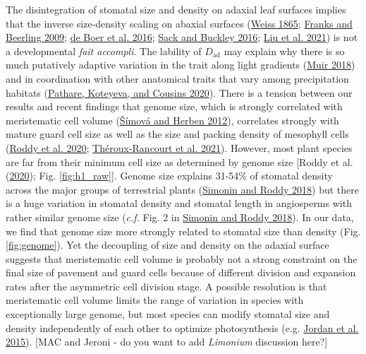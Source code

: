 \documentclass[
  12pt,
]{article}
\begin{document}
The disintegration of stomatal size and density on adaxial leaf surfaces implies that the inverse size-density scaling on abaxial surfaces (\protect\hyperlink{ref-weiss_untersuchungen_1865}{Weiss 1865}; \protect\hyperlink{ref-franks_maximum_2009}{Franks and Beerling 2009}; \protect\hyperlink{ref-de_boer_optimal_2016}{de Boer et al. 2016}; \protect\hyperlink{ref-sack_developmental_2016}{Sack and Buckley 2016}; \protect\hyperlink{ref-liu_scaling_2021}{Liu et al. 2021}) is not a developmental \emph{fait accompli}. The lability of \(D_\text{ad}\) may explain why there is so much putatively adaptive variation in the trait along light gradients (\protect\hyperlink{ref-muir_light_2018}{Muir 2018}) and in coordination with other anatomical traits that vary among precipitation habitats (\protect\hyperlink{ref-pathare_increased_2020}{Pathare, Koteyeva, and Cousins 2020}). There is a tension between our results and recent findings that genome size, which is strongly correlated with meristematic cell volume (\protect\hyperlink{ref-simova_geometrical_2012}{Šímová and Herben 2012}), correlates strongly with mature guard cell size as well as the size and packing density of mesophyll cells (\protect\hyperlink{ref-roddy_scaling_2020}{Roddy et al. 2020}; \protect\hyperlink{ref-theroux-rancourt_maximum_2021}{Théroux-Rancourt et al. 2021}). However, most plant species are far from their minimum cell size as determined by genome size {[}Roddy et al. (\protect\hyperlink{ref-roddy_scaling_2020}{2020}); Fig. \ref{fig:h1_raw}{]}. Genome size explains 31-54\% of stomatal density across the major groups of terrestrial plants (\protect\hyperlink{ref-simonin_genome_2018}{Simonin and Roddy 2018}) but there is a huge variation in stomatal density and stomatal length in angiosperms with rather similar genome size (\emph{c.f.} Fig. 2 in \protect\hyperlink{ref-simonin_genome_2018}{Simonin and Roddy 2018}). In our data, we find that genome size more strongly related to stomatal size than density (Fig. \ref{fig:genome}). Yet the decoupling of size and density on the adaxial surface suggests that meristematic cell volume is probably not a strong constraint on the final size of pavement and guard cells because of different division and expansion rates after the asymmetric cell division stage. A possible resolution is that meristematic cell volume limits the range of variation in species with exceptionally large genome, but most species can modify stomatal size and density independently of each other to optimize photosynthesis (e.g. \protect\hyperlink{ref-jordan_environmental_2015}{Jordan et al. 2015}). {[}MAC and Jeroni - do you want to add \emph{Limonium} discussion here?{]}
\end{document}
